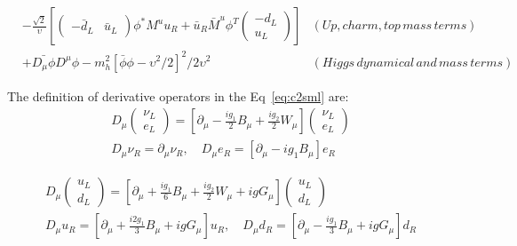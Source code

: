 \begin{equation}
\begin{alignedat}{2}
      & -\frac{\sqrt{2}}{\upsilon}[\begin{pmatrix} -\bar{d}_{L} & \bar{u}_{L} \end{pmatrix}\phi^{*} M^{u}u_{R} + \bar{u}_{R}\bar{M}^{u}\phi^{T}\begin{pmatrix} -d_{L} \\ u_{L} \end{pmatrix}] & (Up, charm, top \, mass \, terms) \\
      & +\bar{D_{\mu}\phi}D^{\mu}\phi - m_{h}^{2}[\bar{\phi}\phi-\upsilon^{2}/2]^{2}/2\upsilon^{2} & (Higgs \, dynamical \, and \, mass \, terms)
 \label{eq:c2sml}
 \end{alignedat}
\end{equation}

The definition of derivative operators in the Eq~\ref{eq:c2sml} are:
\begin{equation}
 \begin{aligned}
  D_{\mu}\begin{pmatrix} \nu_{L} \\ e_{L} \end{pmatrix} = [\partial_{\mu}-\frac{ig_{1}}{2}B_{\mu}+\frac{ig_{2}}{2}W_{\mu}]\begin{pmatrix} \nu_{L} \\ e_{L} \end{pmatrix} \\
  D_{\mu}\nu_{R} = \partial_{\mu}\nu_{R},\quad D_{\mu}e_{R} = [\partial_{\mu}-ig_{1}B_{\mu}]e_{R}
 \end{aligned}
 \label{eq:c2smldl}
\end{equation}

\begin{equation}
 \begin{aligned}
  D_{\mu}\begin{pmatrix} u_{L} \\ d_{L} \end{pmatrix} = [\partial_{\mu}+\frac{ig_{1}}{6}B_{\mu}+\frac{ig_{2}}{2}W_{\mu}+igG_{\mu}]\begin{pmatrix} u_{L} \\ d_{L} \end{pmatrix} \\
  D_{\mu}u_{R} = [\partial_{\mu}+\frac{i2g_{1}}{3}B_{\mu}+igG_{\mu}]u_{R},\quad D_{\mu}d_{R} = [\partial_{\mu}-\frac{ig_{1}}{3}B_{\mu}+igG_{\mu}]d_{R}
 \end{aligned}
 \label{eq:c2smldq}
\end{equation}

